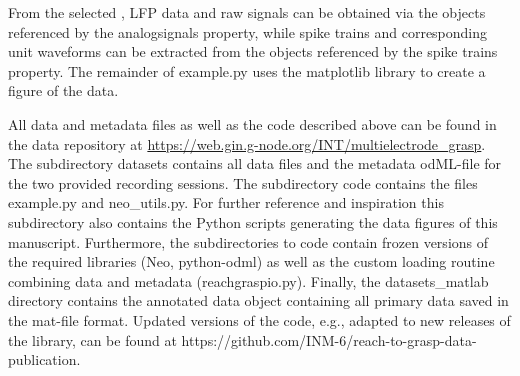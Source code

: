 {From the selected , LFP data and raw signals can be obtained via the  objects referenced by the analogsignals property, while spike trains and corresponding unit waveforms can be extracted from the  objects referenced by the spike trains property. The remainder of example.py uses the matplotlib library to create a figure of the data.

All data and metadata files as well as the code described above can be found in the data repository at \url{https://web.gin.g-node.org/INT/multielectrode_grasp}. The subdirectory datasets contains all data files and the metadata odML-file for the two provided recording sessions. The subdirectory code contains the files example.py and neo\_utils.py. For further reference and inspiration this subdirectory also contains the Python scripts generating the data figures of this manuscript. Furthermore, the subdirectories to code contain frozen versions of the required libraries (Neo, python-odml) as well as the custom loading routine combining data and metadata (reachgraspio.py). Finally, the datasets\_matlab directory contains the annotated  data object containing all primary data saved in the mat-file format. Updated versions of the code, e.g., adapted to new releases of the  library, can be found at https://github.com/INM-6/reach-to-grasp-data-publication.
}

